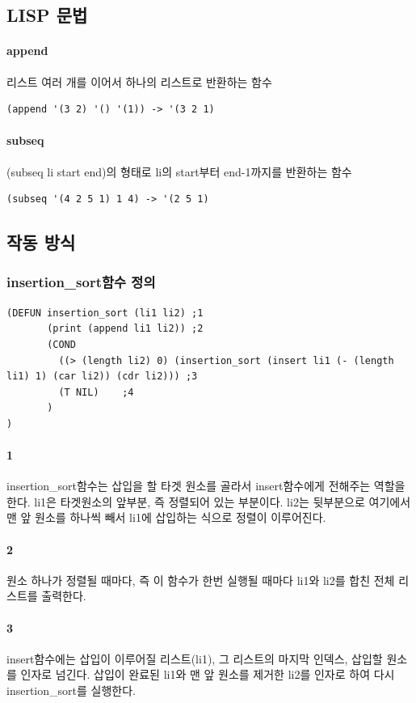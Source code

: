 \documentclass{oblivoir}
\begin{document}
\subsection{LISP 문법}
\paragraph*{append}
리스트 여러 개를 이어서 하나의 리스트로 반환하는 함수
\begin{verbatim}
(append '(3 2) '() '(1)) -> '(3 2 1)
\end{verbatim}

\paragraph*{subseq}
(subseq li start end)의 형태로 li의 start부터 end-1까지를 반환하는 함수
\begin{verbatim}
(subseq '(4 2 5 1) 1 4) -> '(2 5 1)
\end{verbatim}

\subsection{작동 방식}
\subsubsection{insertion\_sort함수 정의}
\begin{verbatim}
(DEFUN insertion_sort (li1 li2) ;1
       (print (append li1 li2)) ;2
       (COND
         ((> (length li2) 0) (insertion_sort (insert li1 (- (length li1) 1) (car li2)) (cdr li2))) ;3
         (T NIL)    ;4
       )
)
\end{verbatim}
\paragraph*{1}
insertion\_sort함수는 삽입을 할 타겟 원소를 골라서 insert함수에게 전해주는 역할을 한다.
li1은 타겟원소의 앞부분, 즉 정렬되어 있는 부분이다.
li2는 뒷부분으로 여기에서 맨 앞 원소를 하나씩 빼서 li1에 삽입하는 식으로 정렬이 이루어진다.

\paragraph*{2}
원소 하나가 정렬될 때마다, 즉 이 함수가 한번 실행될 때마다 li1와 li2를 합친 전체 리스트를 출력한다.

\paragraph*{3}
insert함수에는 삽입이 이루어질 리스트(li1), 그 리스트의 마지막 인덱스, 삽입할 원소를 인자로 넘긴다.
삽입이 완료된 li1와 맨 앞 원소를 제거한 li2를 인자로 하여 다시 insertion\_sort를 실행한다.
\end{document}
